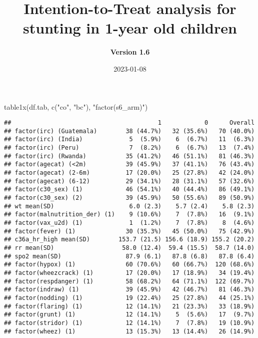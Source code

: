 \documentclass[
]{article}
\title{\textbf{Intention-to-Treat analysis for stunting in 1-year old
children}}
\subtitle{\textbf{Version 1.6}}
\author{}
\date{\vspace{-2.5em}2023-01-08}
\newenvironment{Shaded}{\begin{snugshade}}{\end{snugshade}}
\newcommand{\FunctionTok}[1]{\textcolor[rgb]{0.94,0.94,0.56}{#1}}
\newcommand{\NormalTok}[1]{\textcolor[rgb]{0.80,0.80,0.80}{#1}}
\newcommand{\StringTok}[1]{\textcolor[rgb]{0.80,0.58,0.58}{#1}}
\begin{document}
\maketitle

{
\setcounter{tocdepth}{2}
\tableofcontents
}
\begin{Shaded}
\begin{Highlighting}[]
\FunctionTok{table1x}\NormalTok{(df.tab, }\FunctionTok{c}\NormalTok{(}\StringTok{"co"}\NormalTok{, }\StringTok{"bc"}\NormalTok{),}
                \StringTok{"factor(s6\_arm)"}\NormalTok{)}
\end{Highlighting}
\end{Shaded}

\begin{verbatim}
##                                         1            0      Overall
## factor(irc) (Guatemala)        38 (44.7%)   32 (35.6%)   70 (40.0%)
## factor(irc) (India)             5  (5.9%)    6  (6.7%)   11  (6.3%)
## factor(irc) (Peru)              7  (8.2%)    6  (6.7%)   13  (7.4%)
## factor(irc) (Rwanda)           35 (41.2%)   46 (51.1%)   81 (46.3%)
## factor(agecat) (<2m)           39 (45.9%)   37 (41.1%)   76 (43.4%)
## factor(agecat) (2-6m)          17 (20.0%)   25 (27.8%)   42 (24.0%)
## factor(agecat) (6-12)          29 (34.1%)   28 (31.1%)   57 (32.6%)
## factor(c30_sex) (1)            46 (54.1%)   40 (44.4%)   86 (49.1%)
## factor(c30_sex) (2)            39 (45.9%)   50 (55.6%)   89 (50.9%)
## wt mean(SD)                     6.0 (2.3)    5.7 (2.4)    5.8 (2.3)
## factor(malnutrition_der) (1)    9 (10.6%)    7  (7.8%)   16  (9.1%)
## factor(vax_u2d) (1)             1  (1.2%)    7  (7.8%)    8  (4.6%)
## factor(fever) (1)              30 (35.3%)   45 (50.0%)   75 (42.9%)
## c36a_hr_high mean(SD)        153.7 (21.5) 156.6 (18.9) 155.2 (20.2)
## rr mean(SD)                   58.0 (12.4)  59.4 (15.5)  58.7 (14.0)
## spo2 mean(SD)                  87.9 (6.1)   87.8 (6.8)   87.8 (6.4)
## factor(hypox) (1)              60 (70.6%)   60 (66.7%)  120 (68.6%)
## factor(wheezcrack) (1)         17 (20.0%)   17 (18.9%)   34 (19.4%)
## factor(respdanger) (1)         58 (68.2%)   64 (71.1%)  122 (69.7%)
## factor(indraw) (1)             39 (45.9%)   42 (46.7%)   81 (46.3%)
## factor(nodding) (1)            19 (22.4%)   25 (27.8%)   44 (25.1%)
## factor(flaring) (1)            12 (14.1%)   21 (23.3%)   33 (18.9%)
## factor(grunt) (1)              12 (14.1%)    5  (5.6%)   17  (9.7%)
## factor(stridor) (1)            12 (14.1%)    7  (7.8%)   19 (10.9%)
## factor(wheez) (1)              13 (15.3%)   13 (14.4%)   26 (14.9%)

\end{verbatim}
\end{document}
